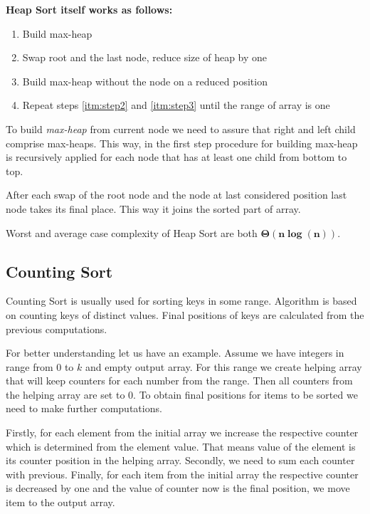 \documentclass[
  field=inf,
  biblatex,
  language=english,
  glossaries,
  index
]{kidiplom}
\begin{document}
\textbf{Heap Sort itself works as follows:}
\begin{enumerate}
 \item \label{itm:step1} Build max-heap
 \item \label{itm:step2} Swap root and the last node, reduce size of heap by one
 \item \label{itm:step3} Build max-heap without the node on a reduced position
 \item Repeat steps \ref{itm:step2} and \ref{itm:step3} until the range of array is one
\end{enumerate}

To build \textit{max-heap} from current node we need to assure that right and left child comprise max-heaps. This way, in the first step procedure for building max-heap is recursively applied for each node that has at least one child from bottom to top.

After each swap of the root node and the node at last considered position last node takes its final place. This way it joins the sorted part of array.

Worst and average case complexity of Heap Sort are both $\bm{\Theta(n \log(n))}$.

\subsection{Counting Sort} \label{sec:counting}

Counting Sort is usually used for sorting keys in some range. Algorithm is based on counting keys of distinct values. Final positions of keys are calculated from the previous computations.

For better understanding let us have an example. Assume we have integers in range from $0$ to $k$ and empty output array. For this range we create helping array that will keep counters for each number from the range. Then all counters from the helping array are set to $0$. To obtain final positions for items to be sorted we need to make further computations. 

Firstly, for each element from the initial array we increase the respective counter which is determined from the element value. That means value of the element is its counter position in the helping array. Secondly, we need to sum each counter with previous. Finally, for each item from the initial array the respective counter is decreased by one and the value of counter now is the final position, we move item to the output array.
\end{document}
